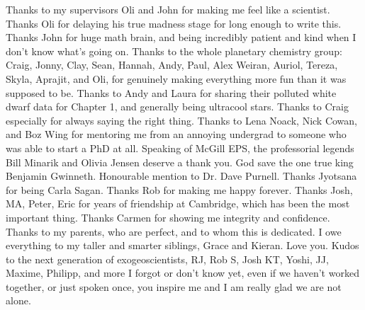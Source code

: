 \begin{acknowledgements}
Thanks to my supervisors Oli and John for making me feel like a scientist. Thanks Oli for delaying his true madness stage for long enough to write this. Thanks John for huge math brain, and being incredibly patient and kind when I don't know what's going on. Thanks to the whole planetary chemistry group: Craig, Jonny, Clay, Sean, Hannah, Andy, Paul, Alex Weiran, Auriol, Tereza, Skyla, Aprajit, and Oli, for genuinely making everything more fun than it was supposed to be. Thanks to Andy and Laura for sharing their polluted white dwarf data for Chapter 1, and generally being ultracool stars. Thanks to Craig especially for always saying the right thing. Thanks to Lena Noack, Nick Cowan, and Boz Wing for mentoring me from an annoying undergrad to someone who was able to start a PhD at all. Speaking of McGill EPS, the professorial legends Bill Minarik and Olivia Jensen deserve a thank you. God save the one true king Benjamin Gwinneth. Honourable mention to Dr. Dave Purnell. Thanks Jyotsana for being Carla Sagan. Thanks Rob for making me happy forever. Thanks Josh, MA, Peter, Eric for years of friendship at Cambridge, which has been the most important thing. Thanks Carmen for showing me integrity and confidence. Thanks to my parents, who are perfect, and to whom this is dedicated. I owe everything to my taller and smarter siblings, Grace and Kieran. Love you. Kudos to the next generation of exogeoscientists, RJ, Rob S, Josh KT, Yoshi, JJ, Maxime, Philipp, and more I forgot or don't know yet, even if we haven't worked together, or just spoken once, you inspire me and I am really glad we are not alone.



\end{acknowledgements}
